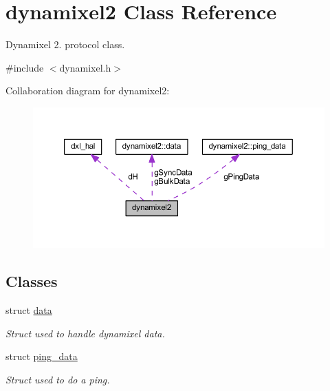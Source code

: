 \hypertarget{classdynamixel2}{}\section{dynamixel2 Class Reference}
\label{classdynamixel2}


Dynamixel 2. protocol class.  




{\ttfamily \#include $<$dynamixel.\+h$>$}



Collaboration diagram for dynamixel2\+:\nopagebreak
\begin{figure}[H]
\begin{center}
\leavevmode
\includegraphics[width=350pt]{d6/d1d/classdynamixel2__coll__graph}
\end{center}
\end{figure}
\subsection*{Classes}
\begin{DoxyCompactItemize}
\item 
struct \hyperlink{structdynamixel2_1_1data}{data}
\begin{DoxyCompactList}\small\item\em Struct used to handle dynamixel data. \end{DoxyCompactList}\item 
struct \hyperlink{structdynamixel2_1_1ping__data}{ping\+\_\+data}
\begin{DoxyCompactList}\small\item\em Struct used to do a ping. \end{DoxyCompactList}\end{DoxyCompactItemize}
